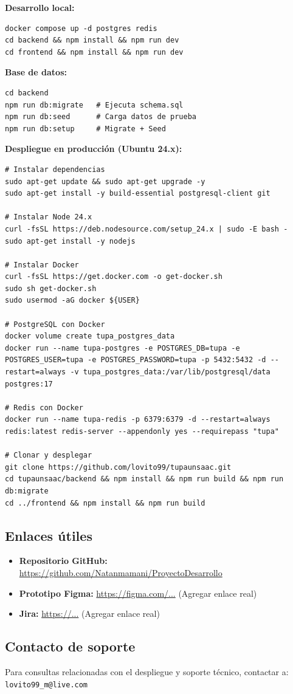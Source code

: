 \textbf{Desarrollo local:}
\begin{verbatim}
docker compose up -d postgres redis
cd backend && npm install && npm run dev
cd frontend && npm install && npm run dev
\end{verbatim}

\textbf{Base de datos:}
\begin{verbatim}
cd backend
npm run db:migrate   # Ejecuta schema.sql
npm run db:seed      # Carga datos de prueba
npm run db:setup     # Migrate + Seed
\end{verbatim}

\textbf{Despliegue en producción (Ubuntu 24.x):}
\begin{verbatim}
# Instalar dependencias
sudo apt-get update && sudo apt-get upgrade -y
sudo apt-get install -y build-essential postgresql-client git

# Instalar Node 24.x
curl -fsSL https://deb.nodesource.com/setup_24.x | sudo -E bash -
sudo apt-get install -y nodejs

# Instalar Docker
curl -fsSL https://get.docker.com -o get-docker.sh
sudo sh get-docker.sh
sudo usermod -aG docker ${USER}

# PostgreSQL con Docker
docker volume create tupa_postgres_data
docker run --name tupa-postgres -e POSTGRES_DB=tupa -e POSTGRES_USER=tupa -e POSTGRES_PASSWORD=tupa -p 5432:5432 -d --restart=always -v tupa_postgres_data:/var/lib/postgresql/data postgres:17

# Redis con Docker
docker run --name tupa-redis -p 6379:6379 -d --restart=always redis:latest redis-server --appendonly yes --requirepass "tupa"

# Clonar y desplegar
git clone https://github.com/lovito99/tupaunsaac.git
cd tupaunsaac/backend && npm install && npm run build && npm run db:migrate
cd ../frontend && npm install && npm run build
\end{verbatim}

\subsection{Enlaces útiles}

\begin{itemize}
    \item \textbf{Repositorio GitHub:} \url{https://github.com/Natanmamani/ProyectoDesarrollo}
    \item \textbf{Prototipo Figma:} \url{https://figma.com/...} (Agregar enlace real)
    \item \textbf{Jira:} \url{https://...} (Agregar enlace real)
\end{itemize}

\subsection{Contacto de soporte}

Para consultas relacionadas con el despliegue y soporte técnico, contactar a: \texttt{lovito99\_m@live.com}
